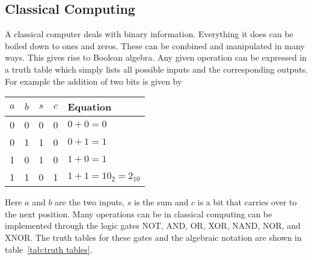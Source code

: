    \subsection{Classical Computing}
    A classical computer deals with binary information.
    Everything it does can be boiled down to ones and zeros.
    These can be combined and manipulated in many ways.
    This gives rise to Boolean algebra.
    Any given operation can be expressed in a truth table which simply lists all possible inputs and the corresponding outputs.
    For example the addition of two bits is given by
    \begin{center}
        \begin{tabular}{cc|cc|l}\hline
            \(a\) & \(b\) & \(s\) & \(c\) & Equation \\\hline
            0 & 0 & 0 & 0 & \(0 + 0 = 0\)\\
            0 & 1 & 1 & 0 & \(0 + 1 = 1\)\\
            1 & 0 & 1 & 0 & \(1 + 0 = 1\)\\
            1 & 1 & 0 & 1 & \(1 + 1 = 10_2 = 2_{10}\)\\\hline
        \end{tabular}
    \end{center}
    Here \(a\) and \(b\) are the two inputs, \(s\) is the sum and \(c\) is a bit that carries over to the next position.
    Many operations can be in classical computing can be implemented through the logic gates NOT, AND, OR, XOR, NAND, NOR, and XNOR.
    The truth tables for these gates and the algebraic notation are shown in table~\ref{tab:truth tables}.
